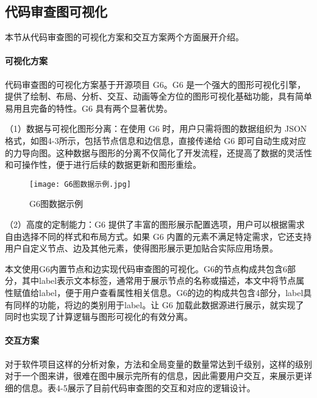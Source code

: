 \subsection{代码审查图可视化}

本节从代码审查图的可视化方案和交互方案两个方面展开介绍。

\paragraph{可视化方案}

代码审查图的可视化方案基于开源项目 G6。G6 是一个强大的图形可视化引擎，提供了绘制、布局、分析、交互、动画等全方位的图形可视化基础功能，具有简单易用且完备的特性。G6 具有两个显著优势。

（1）数据与可视化图形分离：在使用 G6 时，用户只需将图的数据组织为 JSON 格式，如图4-3所示，包括节点信息和边信息，直接传递给 G6 即可自动生成对应的力导向图。这种数据与图形的分离不仅简化了开发流程，还提高了数据的灵活性和可操作性，便于进行后续的数据更新和图形重绘。

\begin{figure}[h]
\centering
\texttt{[image: G6图数据示例.jpg]}
\caption{G6图数据示例}
\end{figure}

（2）高度的定制能力：G6 提供了丰富的图形展示配置选项，用户可以根据需求自由选择不同的样式和布局方式。如果 G6 内置的元素不满足特定需求，它还支持用户自定义节点、边及其他元素，使得图形展示更加贴合实际应用场景。

本文使用G6内置节点和边实现代码审查图的可视化。G6的节点构成共包含6部分，其中label表示文本标签，通常用于展示节点的名称或描述，本文中将节点属性赋值给label，便于用户查看属性相关信息。G6的边的构成共包含4部分，label具有同样的功能，将边的类别用于label。让 G6 加载此数据源进行展示，就实现了同时也实现了计算逻辑与图形可视化的有效分离。


\paragraph{交互方案}

对于软件项目这样的分析对象，方法和全局变量的数量常达到千级别，这样的级别对于一个图来讲，很难在图中展示完所有的信息，因此需要用户交互，来展示更详细的信息。表4-5展示了目前代码审查图的交互和对应的逻辑设计。


